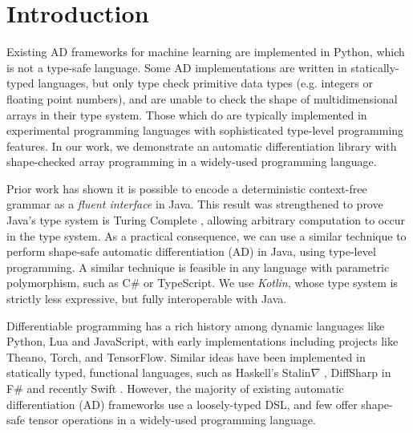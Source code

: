 \documentclass{article}
\begin{document}


\printAffiliationsAndNotice{}  %

\section{Introduction}
\label{submission}

Existing AD frameworks for machine learning are implemented in Python, which is not a type-safe language. Some AD implementations are written in statically-typed languages, but only type check primitive data types (e.g. integers or floating point numbers), and are unable to check the shape of multidimensional arrays in their type system. Those which do are typically implemented in experimental programming languages with sophisticated type-level programming features. In our work, we demonstrate an automatic differentiation library with shape-checked array programming in a widely-used programming language.

Prior work has shown it is possible to encode a deterministic context-free grammar as a \textit{fluent interface} \cite{gil2016formal} in Java. This result was strengthened to prove Java's type system is Turing Complete \cite{Grigore:2017:JGT:3009837.3009871}, allowing arbitrary computation to occur in the type system. As a practical consequence, we can use a similar technique to perform shape-safe automatic differentiation (AD) in Java, using type-level programming. A similar technique is feasible in any language with parametric polymorphism, such as C\# or TypeScript. We use \textit{Kotlin}, whose type system is strictly less expressive, but fully interoperable with Java.

Differentiable programming has a rich history among dynamic languages like Python, Lua and JavaScript, with early implementations including projects like Theano, Torch, and TensorFlow. Similar ideas have been implemented in statically typed, functional languages, such as Haskell's Stalin$\nabla$ \cite{pearlmutter2008using}, DiffSharp in F\# \cite{DBLP:journals_corr_BaydinPS15} and recently Swift \cite{swift}. However, the majority of existing automatic differentiation (AD) frameworks use a loosely-typed DSL, and few offer shape-safe tensor operations in a widely-used programming language.
\end{document}
